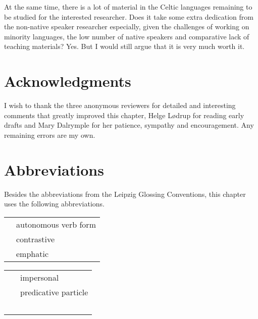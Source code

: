 \documentclass[output=paper,colorlinks,citecolor=brown]{langscibook}
\begin{document}
At the same time, there is a lot of material in the Celtic languages remaining to be studied for the interested researcher. Does it take some extra dedication from the non-native speaker researcher especially, given the challenges of working on minority languages, the low number of native speakers and comparative lack of teaching materials? Yes. But I would still argue that it is very much worth it.

\section*{Acknowledgments}

I wish to thank the three anonymous reviewers for detailed and interesting comments that greatly improved this chapter, Helge L{\o}drup for reading early drafts and Mary Dalrymple for her patience, sympathy and encouragement. Any remaining errors are my own.


\section*{Abbreviations}

Besides the abbreviations from the Leipzig Glossing Conventions, this
chapter uses the following abbreviations.\medskip

\noindent\begin{tabularx}{.45\textwidth}{lQ}
 & autonomous verb form\\
 & contrastive\\
 & emphatic\\
\end{tabularx}\begin{tabularx}{.45\textwidth}{lQ}
 & impersonal\\
 & predicative particle\\~
\end{tabularx}

\printbibliography[heading=subbibliography,notkeyword=this]
\end{document}
